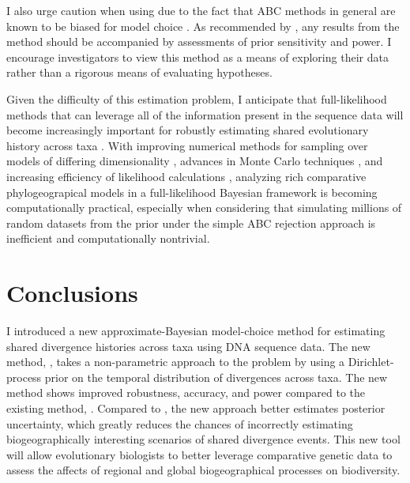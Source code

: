 I also urge caution when using \dppmsbayes due to the fact that ABC methods
in general are known to be biased for model choice \cite{Robert2011}.
As recommended by \cite{Oaks2012}, any results from the method should be
accompanied by assessments of prior sensitivity and power.
I encourage investigators to view this method as a means of exploring their
data rather than a rigorous means of evaluating hypotheses.

Given the difficulty of this estimation problem, I anticipate that
full-likelihood methods that can leverage all of the information present in the
sequence data will become increasingly important for robustly estimating shared
evolutionary history across taxa \cite{JeetDiss}.
With improving numerical methods for sampling over models of differing
dimensionality \cite{Green1995,Lemey2009}, advances in Monte Carlo techniques
\cite{Jordan2012}, and increasing efficiency of likelihood calculations
\cite{Ayres2012}, analyzing rich comparative phylogeograpical models in a
full-likelihood Bayesian framework is becoming computationally practical,
especially when considering that simulating millions of random datasets from
the prior under the simple ABC rejection approach is inefficient and
computationally nontrivial.

\section{Conclusions}
I introduced a new approximate-Bayesian model-choice method for estimating
shared divergence histories across taxa using DNA sequence data.
The new method, \dppmsbayes, takes a non-parametric approach to the problem by
using a Dirichlet-process prior on the temporal distribution of divergences
across taxa.
The new method shows improved robustness, accuracy, and power compared to the
existing method, \msb.
Compared to \msb, the new approach better estimates posterior uncertainty,
which greatly reduces the chances of incorrectly estimating biogeographically
interesting scenarios of shared divergence events.
This new tool will allow evolutionary biologists to better leverage comparative
genetic data to assess the affects of regional and global biogeographical
processes on biodiversity.

